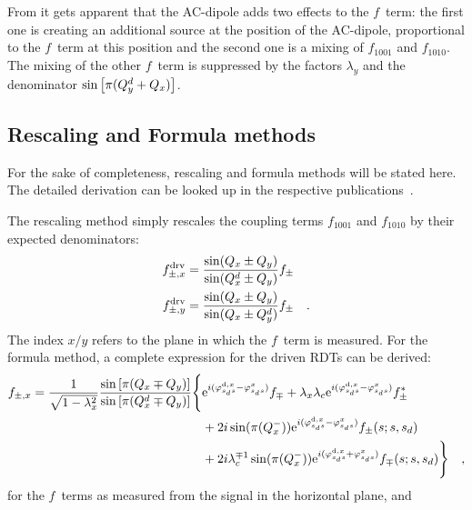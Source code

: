 %
From  it gets apparent that the AC-dipole adds two effects to the $f$~term:
the first one is creating an additional source at the position of the AC-dipole, proportional to the $f$~term
at this position
and the second one is a mixing of $f_{1001}$ and $f_{1010}$. The mixing of the other $f$~term is
suppressed by the factors $\lambda_{y}$ and the denominator $\sin\left[\pi (Q^{d}_{y} + Q_x)\right]$.

\subsection{Rescaling and Formula methods}
\label{sec_rescaling_and_ryo}

For the sake of completeness, rescaling and formula methods will be stated here. The detailed derivation
can be looked up in the respective publications~\cite{Tomas2002, Miyamoto2008}.

The rescaling method simply rescales the coupling terms $f_{1001}$ and $f_{1010}$ by their expected
denominators:
%
\begin{align}
    f_{\pm,x}^\text{drv} &= \frac{\sin(Q_x\pm Q_y)}{\sin(Q^{d}_{x} \pm  Q_y)}f_{\pm}
    \notag \\
    f_{\pm,y}^\text{drv} &= \frac{\sin(Q_x\pm Q_y)}{\sin(Q_x \pm  Q^{d}_{y})}f_{\pm}
    \quad .
\end{align}
%
The index $x/y$ refers to the plane in which the $f$~term is measured.
For the formula method, a complete expression for the driven RDTs can be derived:
%
\begin{align}
    f_{\pm,x} = \frac{1}{\sqrt{1-\lambda_x^2}}
        \frac{
            \sin\left[\pi(Q_x\mp Q_y)\right]
        }{
            \sin\left[\pi(Q^{d}_{x}\mp Q_y)\right]
        }
        \Bigg\{&
        \text{e}^{i(\varphi_{s_ds}^{\text{d},x} - \varphi_{s_ds}^{x} )} f_{\mp}
        +\lambda_x \lambda_c \text{e}^{i(\varphi_{s_ds}^{\text{d},x} - \varphi_{s_ds}^{x} )}f_{\pm}^*
        \notag \\
        & +2i \sin(\pi(Q_x^-))\text{e}^{i(\varphi_{s_ds}^{\text{d},x} - \varphi_{s_ds}^{x} )}f_{\pm}(s;s,s_d)
        \notag \\
        & +2i \lambda_c^{\mp 1} \sin(\pi(Q_x^-))\text{e}^{i(\varphi_{s_ds}^{\text{d},x} + \varphi_{s_ds}^{x} )}f_{\mp}(s;s,s_d)
        \Bigg\}
        \quad ,
\end{align}
%
for the $f$~terms as measured from the signal in the horizontal plane, and

